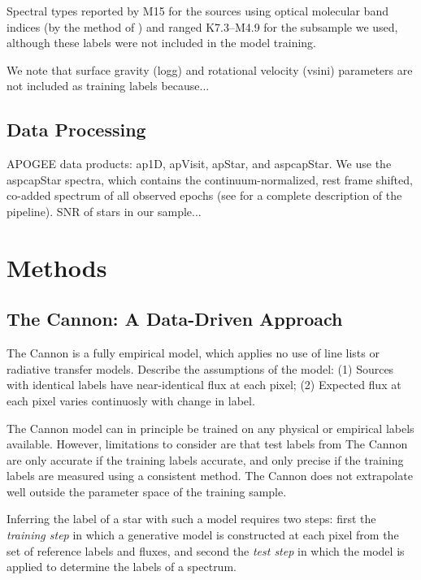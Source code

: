 \documentclass[modern]{aastex62}
\begin{document}
Spectral types reported by M15 for the sources using optical molecular band indices (by the method of \citealt{Lepine:2013}) and ranged K7.3--M4.9 for the subsample we used, although these labels were not included in the model training.

We note that surface gravity (logg) and rotational velocity (vsini) parameters are not included as training labels because...
\color{gcolor}{MANN: comments to add? particularly about the extension sample?}\color{black}

\subsection{Data Processing}

APOGEE data products: ap1D, apVisit, apStar, and aspcapStar. We use the aspcapStar spectra, which contains the continuum-normalized, rest frame shifted, co-added spectrum of all observed epochs (see \citealt{Perez:2016} for a complete description of the pipeline). SNR of stars in our sample...


\section{Methods} \label{sec:cannon}

\subsection{The Cannon: A Data-Driven Approach}

The Cannon is a fully empirical model, which applies no use of line lists or radiative transfer models. Describe the assumptions of the model: (1) Sources with identical labels have near-identical flux at each pixel; (2) Expected flux at each pixel varies continuosly with change in label. 

The Cannon model can in principle be trained on any physical or empirical labels available. However, limitations to consider are that test labels from The Cannon are only accurate if the training labels accurate, and only precise if the training labels are measured using a consistent method. The Cannon does not extrapolate well outside the parameter space of the training sample.

Inferring the label of a star with such a model requires two steps: first the \emph{training step} in which a generative model is constructed at each pixel from the set of reference labels and fluxes, and second the \emph{test step} in which the model is applied to determine the labels of a spectrum.
\end{document}
